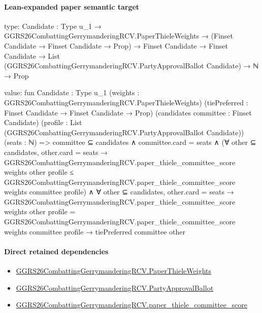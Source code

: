 \documentclass[10pt]{article}
\begin{document}
\paragraph{Lean-expanded paper semantic target}
\begin{ReviewVerbatim}
type:
{Candidate : Type u_1} →
  GGRS26CombattingGerrymanderingRCV.PaperThieleWeights →
    (Finset Candidate → Finset Candidate → Prop) →
      Finset Candidate →
        Finset Candidate → List (GGRS26CombattingGerrymanderingRCV.PartyApprovalBallot Candidate) → ℕ → Prop

value:
fun {Candidate : Type u_1} (weights : GGRS26CombattingGerrymanderingRCV.PaperThieleWeights)
    (tiePreferred : Finset Candidate → Finset Candidate → Prop) (candidates committee : Finset Candidate)
    (profile : List (GGRS26CombattingGerrymanderingRCV.PartyApprovalBallot Candidate)) (seats : ℕ) =>
  committee ⊆ candidates ∧
    committee.card = seats ∧
      (∀ other ⊆ candidates,
          other.card = seats →
            GGRS26CombattingGerrymanderingRCV.paper_thiele_committee_score weights other profile ≤
              GGRS26CombattingGerrymanderingRCV.paper_thiele_committee_score weights committee profile) ∧
        ∀ other ⊆ candidates,
          other.card = seats →
            GGRS26CombattingGerrymanderingRCV.paper_thiele_committee_score weights other profile =
                GGRS26CombattingGerrymanderingRCV.paper_thiele_committee_score weights committee profile →
              tiePreferred committee other
\end{ReviewVerbatim}

\paragraph{Direct retained dependencies}
\begin{itemize}\raggedright
\item \hyperlink{paper-prerequisite-37b91baa3b4ddc9d}{GGRS26\allowbreak{}Combatting\allowbreak{}Gerrymandering\allowbreak{}RCV.\allowbreak{}Paper\allowbreak{}Thiele\allowbreak{}Weights}
\item \hyperlink{governing-declaration-3adeede1bc778473}{GGRS26\allowbreak{}Combatting\allowbreak{}Gerrymandering\allowbreak{}RCV.\allowbreak{}Party\allowbreak{}Approval\allowbreak{}Ballot}
\item \hyperlink{paper-prerequisite-7086a653b0f05ea7}{GGRS26\allowbreak{}Combatting\allowbreak{}Gerrymandering\allowbreak{}RCV.\allowbreak{}paper\_\allowbreak{}thiele\_\allowbreak{}committee\_\allowbreak{}score}
\end{itemize}
\end{document}
